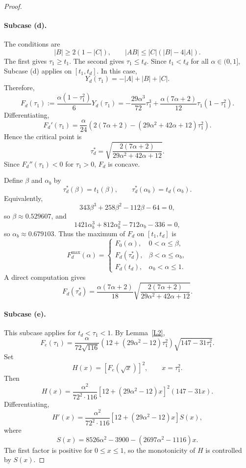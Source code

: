 \documentclass[10pt,a4paper]{amsart}
\numberwithin{equation}{section}
\begin{document}
\begin{proof}
\paragraph{Subcase (d).}
The conditions are
\[
|B|\ge 2(1-|C|),\qquad |AB|\le |C|(|B|-4|A|).
\]
The first gives $\tau_1\ge t_1$. The second gives $\tau_1\le t_d$. Since $t_1<t_d$ for all $\alpha\in(0,1]$, Subcase (d) applies on $[t_1,t_d]$. In this case,
\[
Y_d(\tau_1)
=
-|A|+|B|+|C|.
\]
Therefore,
\[
F_d(\tau_1)
:=
\frac{\alpha(1-\tau_1^2)}{6}Y_d(\tau_1)
=
-\frac{29\alpha^3}{72}\tau_1^3
+
\frac{\alpha(7\alpha+2)}{12}\tau_1(1-\tau_1^2).
\]
Differentiating,
\[
F_d'(\tau_1)
=
\frac{\alpha}{24}
\left(
2(7\alpha+2)
-(29\alpha^2+42\alpha+12)\tau_1^2
\right).
\]
Hence the critical point is
\[
\tau_d^*
=
\sqrt{
\frac{2(7\alpha+2)}
{29\alpha^2+42\alpha+12}
}.
\]
Since $F_d''(\tau_1)<0$ for $\tau_1>0$, $F_d$ is concave.

Define $\beta$ and $\alpha_b$ by
\[
\tau_d^*(\beta)=t_1(\beta),\qquad
\tau_d^*(\alpha_b)=t_d(\alpha_b).
\]
Equivalently,
\[
343\beta^3+258\beta^2-112\beta-64=0,
\]
so $\beta\approx 0.529607$, and
\[
1421\alpha_b^3+812\alpha_b^2-712\alpha_b-336=0,
\]
so $\alpha_b\approx 0.679103$.
Thus the maximum of $F_d$ on $[t_1,t_d]$ is
\[
F_d^{\max}(\alpha)
=
\begin{cases}
F_0(\alpha), & 0<\alpha\le \beta,\\[6pt]
F_d(\tau_d^*), & \beta<\alpha\le \alpha_b,\\[6pt]
F_d(t_d), & \alpha_b<\alpha\le1.
\end{cases}
\]
A direct computation gives
\[
F_d(\tau_d^*)
=
\frac{\alpha(7\alpha+2)}{18}
\sqrt{
\frac{2(7\alpha+2)}
{29\alpha^2+42\alpha+12}
}.
\]

\paragraph{Subcase (e).}
This subcase applies for $t_d<\tau_1<1$. By Lemma~\ref{L2},
\[
F_e(\tau_1)
=
\frac{\alpha}{72\sqrt{116}}
\left(
12+(29\alpha^2-12)\tau_1^2
\right)
\sqrt{147-31\tau_1^2}.
\]
Set
\[
H(x)=[F_e(\sqrt{x})]^2,\qquad x=\tau_1^2.
\]
Then
\[
H(x)
=
\frac{\alpha^2}{72^2\cdot 116}
\left[
12+(29\alpha^2-12)x
\right]^2
(147-31x).
\]
Differentiating,
\[
H'(x)
=
\frac{\alpha^2}{72^2\cdot116}
\left[
12+(29\alpha^2-12)x
\right]
S(x),
\]
where
\[
S(x)
=
8526\alpha^2-3900-(2697\alpha^2-1116)x.
\]
The first factor is positive for $0\le x\le1$, so the monotonicity of $H$ is controlled by $S(x)$.


\end{proof}
\end{document}
